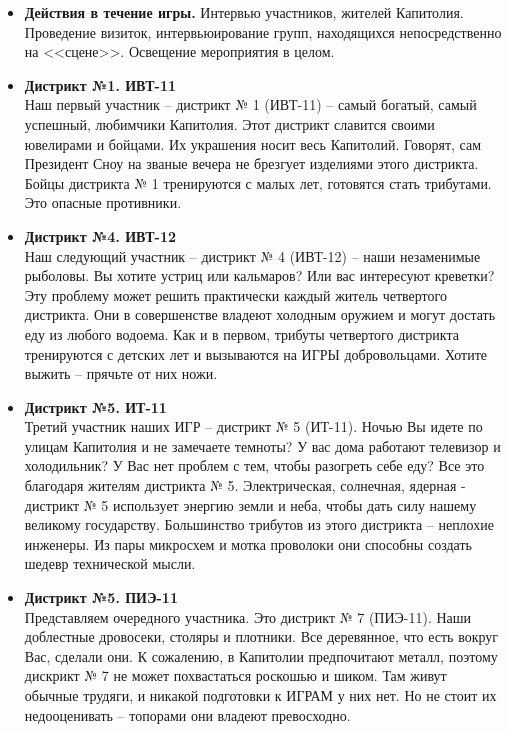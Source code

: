 
\begin{itemize}
\item \textbf{Действия в течение игры.} Интервью участников, жителей Капитолия. Проведение визиток, интервьюирование  групп, находящихся непосредственно на <<сцене>>. Освещение мероприятия в целом.

\item \textbf{Дистрикт №1. ИВТ-11}\\
Наш первый участник – дистрикт № 1 (ИВТ-11) – самый богатый, самый успешный, любимчики Капитолия. Этот дистрикт славится своими ювелирами и бойцами. Их украшения носит весь Капитолий. Говорят, сам Президент Сноу на званые вечера не брезгует изделиями этого дистрикта. Бойцы дистрикта № 1 тренируются с малых лет, готовятся стать трибутами. Это опасные противники.

\item \textbf{Дистрикт №4. ИВТ-12}\\
Наш следующий участник – дистрикт № 4 (ИВТ-12) – наши незаменимые рыболовы. Вы хотите устриц или кальмаров? Или вас интересуют креветки? Эту проблему может решить практически каждый житель четвертого дистрикта. Они в совершенстве владеют холодным оружием и могут достать еду из любого водоема. Как и в первом, трибуты четвертого дистрикта тренируются с детских лет и вызываются на ИГРЫ добровольцами. Хотите выжить – прячьте от них ножи.

\item \textbf{Дистрикт №5. ИТ-11}\\
Третий участник наших ИГР – дистрикт № 5 (ИТ-11). Ночью Вы идете по улицам Капитолия и не замечаете темноты? У вас дома работают телевизор и холодильник? У Вас нет проблем с тем, чтобы разогреть себе еду? Все это благодаря жителям дистрикта № 5. Электрическая, солнечная, ядерная - дистрикт № 5 использует энергию земли и неба, чтобы дать силу нашему великому государству. Большинство трибутов из этого дистрикта – неплохие инженеры. Из пары микросхем и мотка проволоки они способны создать шедевр технической мысли.

\item \textbf{Дистрикт №5. ПИЭ-11}\\
Представляем очередного участника. Это дистрикт № 7 (ПИЭ-11). Наши доблестные дровосеки, столяры и плотники. Все деревянное, что есть вокруг Вас, сделали они. К сожалению, в Капитолии предпочитают металл, поэтому дискрикт № 7 не может похвастаться роскошью и шиком. Там живут обычные трудяги, и никакой подготовки к ИГРАМ у них нет. Но не стоит их недооценивать – топорами они владеют превосходно.


\end{itemize}

